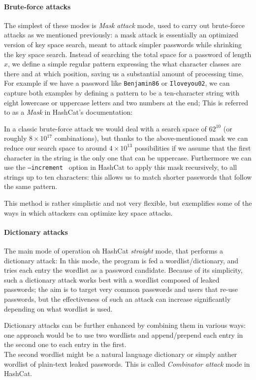 \paragraph{Brute-force attacks}\label{par:brute-force}
The simplest of these modes is \emph{Mask attack} mode, used to carry out brute-force attacks as we mentioned previously: a mask attack is essentially an optimized version of key space search, meant to attack simpler passwords while shrinking the key space search. 
Instead of searching the total space for a password of length $x$, we define a simple regular pattern expressing the what character classes are there and at which position, saving us a substantial amount of processing time.
For example if we have a password like \texttt{Benjamin86} or \texttt{Iloveyou02}, we can capture both examples by defining a pattern to be a ten-character string with eight lowercase or uppercase letters and two numbers at the end; This is referred to as a \emph{Mask} in HashCat's documentation:

In a classic brute-force attack we would deal with a search space of $62^{10}$ (or roughly $8 \times 10^{17}$ combinations), but thanks to the above-mentioned mask we can reduce our search space to around $4 \times 10^{13}$ possibilities if we assume that the first character in the string is the only one that can be uppercase.
Furthermore we can use the \texttt{--increment } option in HashCat to apply this mask recursively, to all strings up to ten characters: this allows us to match shorter passwords that follow the same pattern.

This method is rather simplistic and not very flexible, but exemplifies some of the ways in which attackers can optimize key space attacks.

\paragraph{Dictionary attacks}
The main mode of operation oh HashCat \emph{straight} mode, that performs a dictionary attack: In this mode, the program is fed a wordlist/dictionary, and tries each entry the wordlist as a password candidate. Because of its simplicity, such a dictionary attack works best with a wordlist composed of leaked passwords; the aim is to target very common passwords and users that re-use passwords, but the effectiveness of such an attack can increase significantly depending on what wordlist is used.

Dictionary attacks can be further enhanced by combining them in various ways: one approach would be to use two wordlists and append/prepend each entry in the second one to each entry in the first.\\ 
The second wordlist might be a natural language dictionary or simply anther wordlist of plain-text leaked passwords. This is called \emph{Combinator attack} mode in HashCat. 

